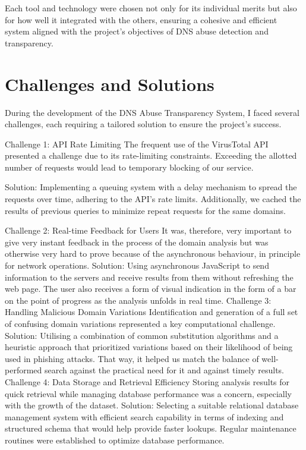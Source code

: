 Each tool and technology were chosen not only for its individual merits but also for how well it integrated with the others, ensuring a cohesive and efficient system aligned with the project's objectives of DNS abuse detection and transparency.


\section{Challenges and Solutions}

During the development of the DNS Abuse Transparency System, I faced several challenges, each requiring a tailored solution to ensure the project's success.

Challenge 1: API Rate Limiting
The frequent use of the VirusTotal API presented a challenge due to its rate-limiting constraints. Exceeding the allotted number of requests would lead to temporary blocking of our service.

Solution: Implementing a queuing system with a delay mechanism to spread the requests over time, adhering to the API's rate limits. Additionally, we cached the results of previous queries to minimize repeat requests for the same domains.

Challenge 2: Real-time Feedback for Users
It was, therefore, very important to give very instant feedback in the process of the domain analysis but was otherwise very hard to prove because of the asynchronous behaviour, in principle for network operations.
Solution: Using asynchronous JavaScript to send information to the servers and receive results from them without refreshing the web page. The user also receives a form of visual indication in the form of a bar on the point of progress as the analysis unfolds in real time.
Challenge 3: Handling Malicious Domain Variations
Identification and generation of a full set of confusing domain variations represented a key computational challenge.
Solution: Utilising a combination of common substitution algorithms and a heuristic approach that prioritized variations based on their likelihood of being used in phishing attacks. That way, it helped us match the balance of well-performed search against the practical need for it and against timely results.
Challenge 4: Data Storage and Retrieval Efficiency
Storing analysis results for quick retrieval while managing database performance was a concern, especially with the growth of the dataset.
Solution: Selecting a suitable relational database management system with efficient search capability in terms of indexing and structured schema that would help provide faster lookups. Regular maintenance routines were established to optimize database performance.

